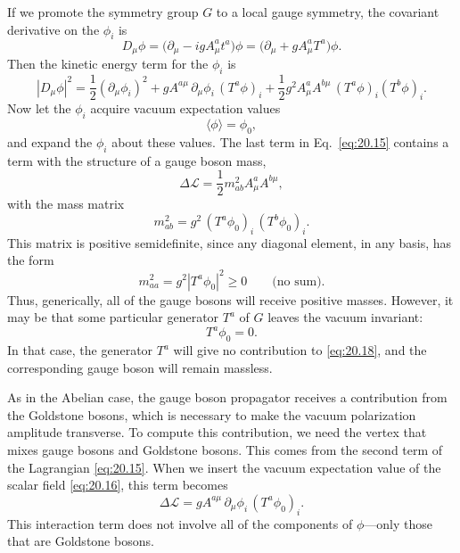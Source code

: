 If we promote the symmetry group $G$ to a local gauge symmetry, the
covariant derivative on the $\phi_i$ is
\begin{equation}
  D_\mu\phi = \bigl( \partial_\mu - igA^a_\mu t^a \bigr)\phi
  = \bigl( \partial_\mu + gA^a_\mu T^a \bigr)\phi .
  \label{eq:20.15}
\end{equation}
Then the kinetic energy term for the $\phi_i$ is
\begin{equation}
  |D_\mu\phi|^2 = \frac{1}{2}(\partial_\mu\phi_i)^2
    + gA^{a\mu}\,\partial_\mu\phi_i\,(T^a\phi)_i
    + \frac{1}{2}g^2A^a_\mu A^{b\mu}\,(T^a\phi)_i(T^b\phi)_i .
\end{equation}
Now let the $\phi_i$ acquire vacuum expectation values
\begin{equation}
  \langle\phi\rangle = \phi_0 ,
  \label{eq:20.16}
\end{equation}
and expand the $\phi_i$ about these values.  The last term in Eq.~\eqref{eq:20.15}
contains a term with the structure of a gauge boson mass,
\begin{equation}
  \Delta\mathcal{L} = \frac{1}{2}m^2_{ab}A^a_\mu A^{b\mu} ,
  \label{eq:20.17}
\end{equation}
with the mass matrix
\begin{equation}
  m^2_{ab} = g^2\,(T^a\phi_0)_i\,(T^b\phi_0)_i .
  \label{eq:20.18}
\end{equation}
This matrix is positive semidefinite, since any diagonal element, in any
basis, has the form
\begin{equation}
  m^2_{aa} = g^2|T^a\phi_0|^2 \ge 0 \qquad \text{(no sum)} .
\end{equation}
Thus, generically, all of the gauge bosons will receive positive masses.
However, it may be that some particular generator $T^a$ of $G$ leaves the
vacuum invariant:
\begin{equation}
  T^a\phi_0 = 0 .
\end{equation}
In that case, the generator $T^a$ will give no contribution to
\eqref{eq:20.18}, and the corresponding gauge boson will remain massless.

As in the Abelian case, the gauge boson propagator receives a contribution
from the Goldstone bosons, which is necessary to make the vacuum polarization
amplitude transverse.  To compute this contribution, we need the vertex that
mixes gauge bosons and Goldstone bosons.  This comes from the second term of
the Lagrangian \eqref{eq:20.15}.  When we insert the vacuum expectation value
of the scalar field \eqref{eq:20.16}, this term becomes
\begin{equation}
  \Delta\mathcal{L} = gA^{a\mu}\,\partial_\mu\phi_i\,(T^a\phi_0)_i .
  \label{eq:20.19}
\end{equation}
This interaction term does not involve all of the components of $\phi$---only
those that are Goldstone bosons.


